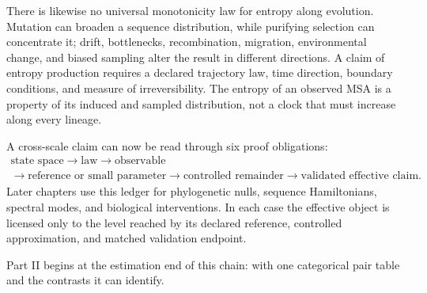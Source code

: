 There is likewise no universal monotonicity law for entropy along evolution.  Mutation can broaden
a sequence distribution, while purifying selection can concentrate it; drift, bottlenecks,
recombination, migration, environmental change, and biased sampling alter the result in different
directions.  A claim of entropy production requires a declared trajectory law, time direction,
boundary conditions, and measure of irreversibility.  The entropy of an observed MSA is a property
of its induced and sampled distribution, not a clock that must increase along every lineage.

A cross-scale claim can now be read through six proof obligations:
\begin{equation}
\boxed{
\begin{gathered}
\text{state space}
\to\text{law}
\to\text{observable}\\
{}\to\text{reference or small parameter}
\to\text{controlled remainder}
\to\text{validated effective claim}.
\end{gathered}}
\label{eq:book-cross-scale-proof-obligations}
\end{equation}
Later chapters use this ledger for phylogenetic nulls, sequence Hamiltonians, spectral modes, and
biological interventions.  In each case the effective object is licensed only to the level reached
by its declared reference, controlled approximation, and matched validation endpoint.

Part II begins at the estimation end of this chain: with one categorical pair table and the
contrasts it can identify.

